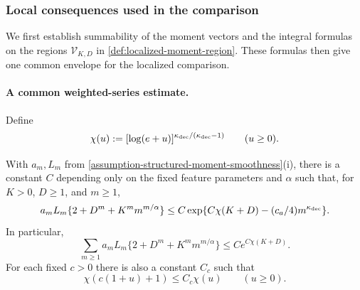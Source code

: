 \subsubsection{Local consequences used in the comparison}

We first establish summability of the moment vectors and the integral
formulas on the regions $\mathcal V_{K,D}$ in
\cref{def:localized-moment-region}. These formulas then give one common
envelope for the localized comparison.

\paragraph{A common weighted-series estimate.}
Define
\begin{equation}
\label{eq:weighted-series-growth-function}
 \chi(u):=[\log(e+u)]^{\kappa_{\rm dec}/(\kappa_{\rm dec}-1)}\qquad(u\ge0).
\end{equation}
\begin{lemma}
\label{lem:weighted-series-estimate}
With $a_m,L_m$ from \cref{assumption-structured-moment-smoothness}(i),
there is a constant $C$ depending only on the fixed feature parameters
and $\alpha$ such that, for $K>0$, $D\ge1$, and $m\ge1$,
\begin{equation}
\label{eq:weighted-series-summand-bound}
 a_mL_m\{2+D^m+K^m m^{m/\alpha}\}
 \le C\exp\{C\chi(K+D)-(c_a/4)m^{\kappa_{\rm dec}}\}.
\end{equation}
In particular,
\begin{equation}
\label{eq:weighted-series-sum-bound}
 \sum_{m\ge1}a_mL_m\{2+D^m+K^m m^{m/\alpha}\}
 \le Ce^{C\chi(K+D)}.
\end{equation}
For each fixed $c>0$ there is also a constant $C_c$ such that
\begin{equation}
\label{eq:weighted-series-scale-comparison}
 \chi(c(1+u)+1)\le C_c\chi(u)\qquad(u\ge0).
\end{equation}
\end{lemma}
